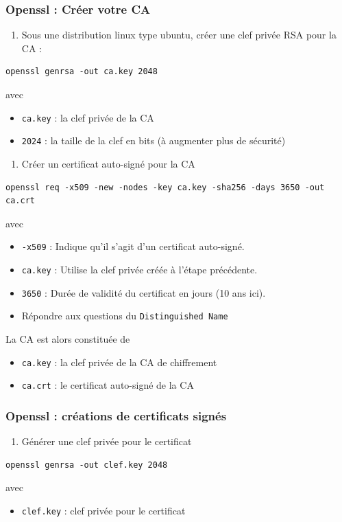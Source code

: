 \documentclass[french, 12pt]{article}%
\newcommand{\itemE}{\item[$\bullet$]}
\begin{document}
\subsubsection{Openssl : Créer votre CA}
\begin{enumerate}
\item Sous une distribution linux type ubuntu, créer une clef privée RSA pour la CA : 
\end{enumerate}

\begin{lstlisting}[style=commande]
openssl genrsa -out ca.key 2048
\end{lstlisting}
avec
\begin{itemize}
\itemE \verb?ca.key? : la clef privée de la CA
\itemE \verb?2024? : la taille de la clef en bits (à augmenter plus de sécurité)
\end{itemize}


\begin{enumerate}[resume]
\item Créer un certificat auto-signé pour la CA
\end{enumerate}
\begin{lstlisting}[style=commande]
openssl req -x509 -new -nodes -key ca.key -sha256 -days 3650 -out ca.crt
\end{lstlisting}
avec 

\begin{itemize}
\itemE \verb?-x509? : Indique qu'il s'agit d'un certificat auto-signé.
\itemE \verb?ca.key? : Utilise la clef privée créée à l'étape précédente.
\itemE \verb?3650? : Durée de validité du certificat en jours (10 ans ici).
\itemE Répondre aux questions du \verb?Distinguished Name?
\end{itemize}


\vspace{0.5cm}
La CA est alors constituée de
\begin{itemize}
\itemE \verb?ca.key? : la clef privée de la CA de chiffrement
\itemE \verb?ca.crt? : le certificat auto-signé de la CA 
\end{itemize}


\subsubsection{Openssl : créations de certificats signés}


\begin{enumerate}
\item  Générer une clef privée pour le certificat
\end{enumerate}
\begin{lstlisting}[style=commande]
openssl genrsa -out clef.key 2048
\end{lstlisting}
avec 
\begin{itemize}
\itemE \verb?clef.key? : clef privée pour le certificat
\end{itemize}
\end{document}
